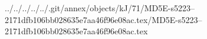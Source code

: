 ../../../../../.git/annex/objects/kJ/71/MD5E-s5223--2171dfb106bb028635e7aa46f96e08ac.tex/MD5E-s5223--2171dfb106bb028635e7aa46f96e08ac.tex